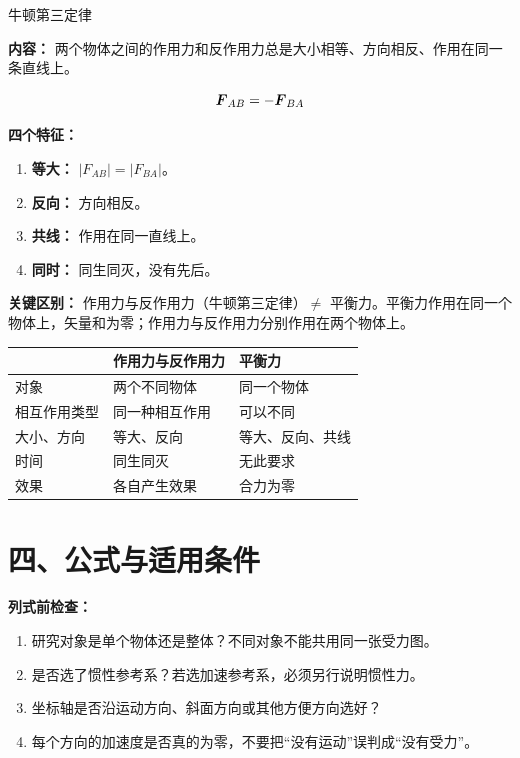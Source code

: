 \begin{conceptbox}{牛顿第三定律}

\textbf{内容：} 两个物体之间的作用力和反作用力总是大小相等、方向相反、作用在同一条直线上。

\[
\boldsymbol{F}_{AB} = -\boldsymbol{F}_{BA}
\]

\textbf{四个特征：}
\begin{enumerate}
  \item \textbf{等大：} $|F_{AB}| = |F_{BA}|$。
  \item \textbf{反向：} 方向相反。
  \item \textbf{共线：} 作用在同一直线上。
  \item \textbf{同时：} 同生同灭，没有先后。
\end{enumerate}

\textbf{关键区别：} 作用力与反作用力（牛顿第三定律）$\neq$ 平衡力。平衡力作用在同一个物体上，矢量和为零；作用力与反作用力分别作用在两个物体上。

\begin{center}
\begin{tabular}{lll}
\toprule
 & 作用力与反作用力 & 平衡力 \\
\midrule
对象 & 两个不同物体 & 同一个物体 \\
相互作用类型 & 同一种相互作用 & 可以不同 \\
大小、方向 & 等大、反向 & 等大、反向、共线 \\
时间 & 同生同灭 & 无此要求 \\
效果 & 各自产生效果 & 合力为零 \\
\bottomrule
\end{tabular}
\end{center}

\begin{center}


\label{fig:newton-third-compare}
\end{center}

\end{conceptbox}

\section*{四、公式与适用条件}

\textbf{列式前检查：}
\begin{enumerate}
  \item 研究对象是单个物体还是整体？不同对象不能共用同一张受力图。
  \item 是否选了惯性参考系？若选加速参考系，必须另行说明惯性力。
  \item 坐标轴是否沿运动方向、斜面方向或其他方便方向选好？
  \item 每个方向的加速度是否真的为零，不要把“没有运动”误判成“没有受力”。
\end{enumerate}

